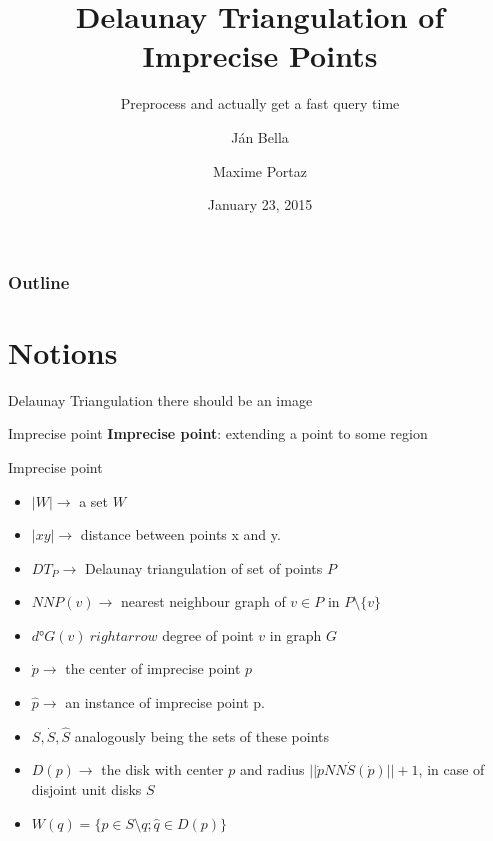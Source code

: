 \documentclass{beamer}
\author{J\'an Bella \and Maxime Portaz}
\title{Delaunay Triangulation of Imprecise Points}
\subtitle{Preprocess and actually get a fast query time}
\institute{Grenoble INP}
\date{January 23, 2015}
\begin{document}
\frame{\titlepage}

\begin{frame}
\frametitle{Outline}
\tableofcontents
\end{frame}

\section{Notions}
\frame{\tableofcontents[currentsection]}

\begin{frame}{Delaunay Triangulation}
there should be an image
\begin{figure}
		\centering
		\hspace*{-0.5cm}%
	\end{figure}

	
\end{frame}

\begin{frame}{Imprecise point}
\textbf{Imprecise point}: extending a point to some region
\end{frame}

\begin{frame}{Imprecise point}
\begin{itemize}
\item $|W| \rightarrow $ a set $W$
\item $|xy| \rightarrow $ distance between points x and y.
\item $DT_P \rightarrow $ Delaunay triangulation of set of points $P$
\item $NNP(v) \rightarrow $ nearest neighbour graph of $v \in P$ in $P \setminus \{v\}$
\item $d°G(v) \ rightarrow $ degree of point $v$ in graph $G$
\item $\dot{p} \rightarrow $ the center of imprecise point $p$
\item $\hat{p} \rightarrow $ an instance of imprecise point p.
\item $S, \dot{S}, \hat{S} $ analogously being the sets of these points
\item $D(p) \rightarrow $ the disk with center $p$ and radius $||\dot{p} NN\dot{S}(\dot{p})|| + 1$, in case of disjoint unit disks $S$
\item $W(q) = \{p \in S \setminus {q}; \hat{q} \in D(p)\}$ 
\end{itemize}

\end{frame}
\end{document}
